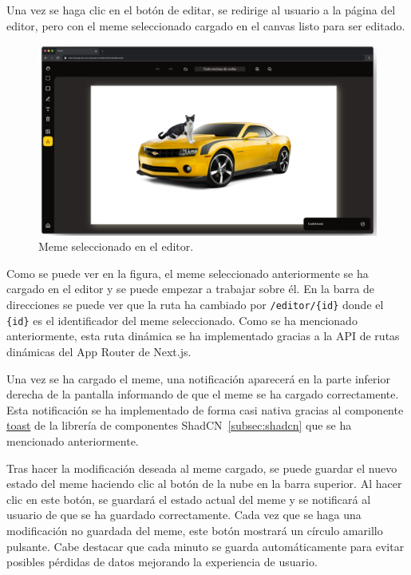 Una vez se haga clic en el botón de editar, se redirige al usuario a la página del editor, pero con el meme seleccionado cargado en el canvas listo para ser editado.

\begin{figure}[H]
    \caption{Meme seleccionado en el editor.}
    \centering
    \vspace*{0.5cm}
    \includegraphics[scale=0.3]{figuras/meme_gato_editor.png}
\end{figure}

Como se puede ver en la figura, el meme seleccionado anteriormente se ha cargado en el editor y se puede empezar a trabajar sobre él. En la barra de direcciones se puede ver que la ruta ha cambiado por \texttt{/editor/\{id\}} donde el \texttt{\{id\}} es el identificador del meme seleccionado. Como se ha mencionado anteriormente, esta ruta dinámica se ha implementado gracias a la API de rutas dinámicas del App Router de Next.js.

Una vez se ha cargado el meme, una notificación aparecerá en la parte inferior derecha de la pantalla informando de que el meme se ha cargado correctamente. Esta notificación se ha implementado de forma casi nativa gracias al componente \href{https://ui.shadcn.com/docs/components/toast}{toast} de la librería de componentes ShadCN~\ref{subsec:shadcn} que se ha mencionado anteriormente.

Tras hacer la modificación deseada al meme cargado, se puede guardar el nuevo estado del meme haciendo clic al botón de la nube en la barra superior. Al hacer clic en este botón, se guardará el estado actual del meme y se notificará al usuario de que se ha guardado correctamente. Cada vez que se haga una modificación no guardada del meme, este botón mostrará un círculo amarillo pulsante. Cabe destacar que cada minuto se guarda automáticamente para evitar posibles pérdidas de datos mejorando la experiencia de usuario.

